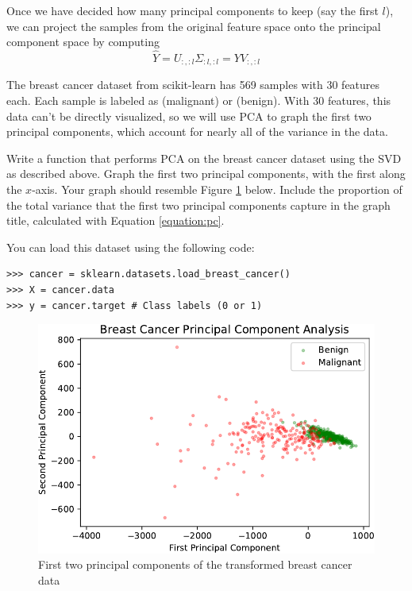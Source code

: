 Once we have decided how many principal components to keep (say the first $l$), we can project the samples from the original feature space onto the principal component space by computing
\begin{equation*}
\widehat{Y} = U_{:,:l}\Sigma_{:l,:l} = YV_{:,:l}
\end{equation*}

\begin{problem}%

The breast cancer dataset from scikit-learn has 569 samples with 30 features each.
Each sample is labeled as  (malignant) or  (benign).
With 30 features, this data can't be directly visualized, so we will use PCA to graph the first two principal components, which account for nearly all of the variance in the data.

Write a function that performs PCA on the breast cancer dataset using the SVD as described above.
Graph the first two principal components, with the first along the $x$-axis.
Your graph should resemble Figure \ref{fig:cancer} below.
Include the proportion of the total variance that the first two principal components capture in the graph title, calculated with Equation \ref{equation:pc}.
\label{problem:cancer}

You can load this dataset using the following code:
\begin{lstlisting}
>>> cancer = sklearn.datasets.load_breast_cancer()
>>> X = cancer.data
>>> y = cancer.target # Class labels (0 or 1)
\end{lstlisting}
\end{problem}

\begin{figure}[H]
\includegraphics[width=.7\textwidth]{figures/cancer.pdf}
\caption{First two principal components of the transformed breast cancer data}
\label{fig:cancer}
\end{figure}

